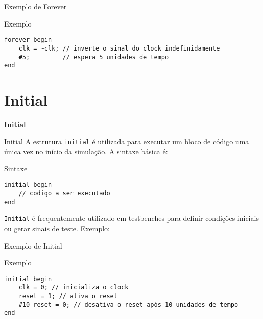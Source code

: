 \documentclass[aspectratio=169,xcolor=dvipsnames]{beamer}
\begin{document}
\begin{frame}[fragile]{Exemplo de Forever}
\begin{block}{Exemplo}
\begin{verbatim}
forever begin
    clk = ~clk; // inverte o sinal do clock indefinidamente
    #5;         // espera 5 unidades de tempo
end
\end{verbatim}
\end{block}
\end{frame}

\section{Initial}

\begin{frame}
    \Huge{\centerline{\textbf{Initial}}}
\end{frame}

\begin{frame}[fragile]{Initial}
A estrutura \texttt{initial} é utilizada para executar um bloco de código uma única vez no início da simulação. A sintaxe básica é:
\begin{block}{Sintaxe}
\begin{verbatim}
initial begin
    // codigo a ser executado
end
\end{verbatim}
\end{block}

\texttt{Initial} é frequentemente utilizado em testbenches para definir condições iniciais ou gerar sinais de teste. Exemplo:
\end{frame}

\begin{frame}[fragile]{Exemplo de Initial}
\begin{block}{Exemplo}
\begin{verbatim}
initial begin
    clk = 0; // inicializa o clock
    reset = 1; // ativa o reset
    #10 reset = 0; // desativa o reset após 10 unidades de tempo
end
\end{verbatim}
\end{block}
\end{frame}
\end{document}
